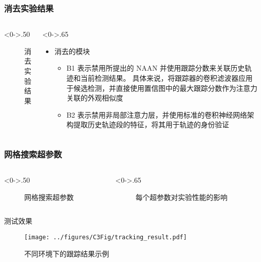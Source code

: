 \begin{frame}
	\frametitle{消去实验结果}
	\begin{columns}[T] %
		\begin{column}<0->{.50\textwidth}
			\begin{figure}[thpb]
				\centering
				\caption{消去实验结果}
			\end{figure}
		\end{column}
		\hfill%
		\begin{column}<0->{.65\textwidth}
			\begin{itemize}
				\item<1-> 消去的模块
				\begin{itemize}
					\item<1-> B1 表示禁用所提出的 NAAN 并使用跟踪分数来关联历史轨迹和当前检测结果。 
					具体来说，将跟踪器的卷积滤波器应用于候选检测，并直接使用置信图中的最大跟踪分数作为注意力关联的外观相似度
					\item<1->B2 表示禁用非局部注意力层，并使用标准的卷积神经网络架构提取历史轨迹段的特征，将其用于轨迹的身份验证
				\end{itemize}
				
			\end{itemize}
		\end{column}%
	\end{columns}
\end{frame}



\begin{frame}
	\frametitle{网格搜索超参数}
	\begin{columns}[T] %
		\begin{column}<0->{.50\textwidth}
			\begin{figure}[thpb]
				\centering
				\caption{网格搜索超参数}
			\end{figure}
		\end{column}
		\hfill%
		\begin{column}<0->{.65\textwidth}
			\begin{figure}[thpb]
				\centering
				\caption{每个超参数对实验性能的影响}
			\end{figure}
		\end{column}%
	\end{columns}
\end{frame}


\begin{frame}{测试效果}
	\begin{figure}[!t]
		\centering
		\texttt{[image: ../figures/C3Fig/tracking\_result.pdf]}
		\caption{不同环境下的跟踪结果示例}
	\end{figure}
\end{frame}

